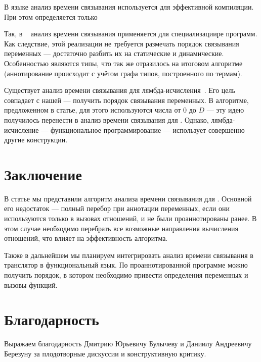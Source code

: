 \documentclass[conference,american,russian]{IEEEtran}
\begin{document}
В языке \mercury{} анализ времени связывания используется для эффективной компиляции. 
При этом определяется только 

Так, в \mercury{}~\cite{vanhoof2004binding} анализ времени связывания применяется для специализациире программ. 
Как следствие, этой реализации не требуется размечать порядок связывания переменных --- достаточно разбить их на статические и динамические. Особенностью \mercury{} являются типы, что так же отразилось на итоговом алгоритме (аннотирование происходит с учётом графа типов, построенного по термам).

Существует анализ времени связывания для лямбда-исчисления~\cite{Thiemann1997AUF}. Его цель совпадает с нашей --- получить порядок связывания переменных. В алгоритме, предложенном в статье, для этого используются числа от $0$ до $D$ --- эту идею получилось перенести в анализ времени связывания для \miniKanren{}. Однако, лямбда-исчисление --- функциональное программирование --- использует совершенно другие конструкции.

\section{Заключение}\label{conclusion}

В статье мы представили алгоритм анализа времени связывания для \miniKanren{}. Основной его недостаток --- полный перебор при аннотации переменных, если они используются только в вызовах отношений, и не были проаннотированы ранее. В этом случае необходимо перебрать все возможные направления вычисления отношений, что влияет на эффективность алгоритма.

Также в дальнейшем мы планируем интегрировать анализ времени связывания в транслятор в функциональный язык. По проаннотированной программе можно получить порядок, в котором необходимо привести определения переменных и вызовы функций.

\section*{Благодарность}

Выражаем благодарность Дмитрию Юрьевичу Булычеву и Даниилу Андреевичу Березуну за плодотворные дискуссии и конструктивную критику.



\end{document}
